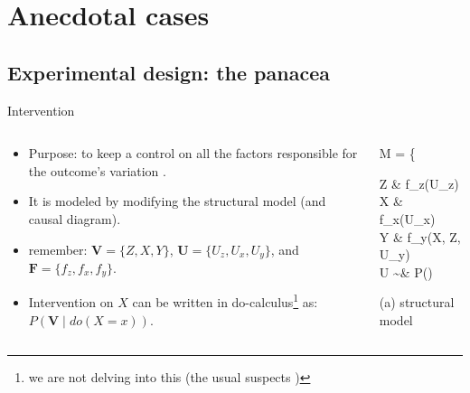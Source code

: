 \section{Anecdotal cases}
%
%
\subsection{Experimental design: the panacea}
%
%
\begin{frame}[t, negative]
	\subsectionpage
\end{frame}
%
%
\begin{frame}
	{Intervention}
	\begin{columns}
		\begin{column}{0.5\textwidth}
			\begin{itemize}
				\item Purpose: to keep a control on all the factors responsible for the outcome's variation .
				\item It is modeled by modifying the structural model (and causal diagram).
				\item remember: $\pmb{V}=\{Z,X,Y\}$, $\pmb{U}=\{U_{z},U_{x},U_{y}\}$, and $\pmb{F}=\{f_{z},f_{x},f_{y}\}$.
				\item Intervention on $X$ can be written in do-calculus\footnote{we are not delving into this (the usual suspects \cite{Pearl_1988, Pearl_2009, Pearl_et_al_2016, Pearl_et_al_2018})} as: $P(\pmb{V} \; | \; do(X=x))$.
			\end{itemize}
		\end{column}
		\begin{column}{0.5\textwidth}  
			\begin{equ}
				M = \left\{ \begin{aligned} 
					Z \leftarrow & \; f_{z}(U_{z}) \\
					X \leftarrow & \; f_{x}(U_{x}) \\
					Y \leftarrow & \; f_{y}(X, Z, U_{y}) \\
					U \sim & \; P()
				\end{aligned} \right
				\caption*{(a) structural model}
			\end{equ}
			\begin{figure}
\end{figure}
\end{column}
\end{columns}
\end{frame}
